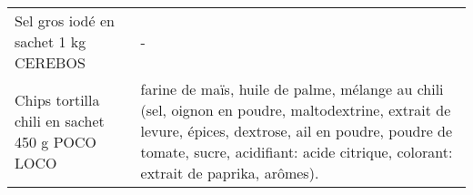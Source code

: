 \begin{longtable}{p{5cm}p{10cm}}
                                                                     Sel gros iodé en sachet 1 kg CEREBOS &                                                                                                                                                                                                                                                                                                                                                                                                                                                                                                                                                                                                                                                                                                                                                                                                                                                                                                                                                                                                                                        - \\
                                                           Chips tortilla chili en sachet 450 g POCO LOCO &                                                                                                                                                                                                                                                                                                                                                                                                                                                                                                                                                                                                                                                                                                                                                                                                  farine de maïs, huile de palme, mélange au chili (sel, oignon en poudre, maltodextrine, extrait de levure, épices, dextrose, ail en poudre, poudre de tomate, sucre, acidifiant: acide citrique, colorant: extrait de paprika, arômes). \\

\end{longtable}
